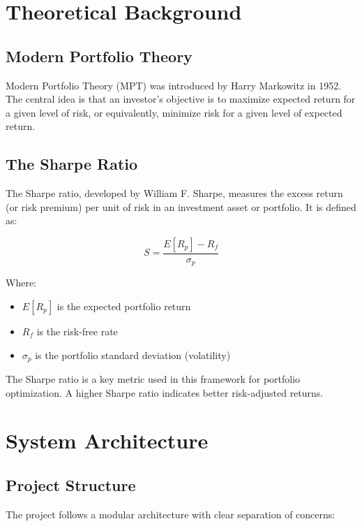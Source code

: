 \documentclass[11pt,a4paper]{article}
\begin{document}
\section{Theoretical Background}

\subsection{Modern Portfolio Theory}

Modern Portfolio Theory (MPT) was introduced by Harry Markowitz in 1952. The central idea is that an investor's objective is to maximize expected return for a given level of risk, or equivalently, minimize risk for a given level of expected return.

\subsection{The Sharpe Ratio}

The Sharpe ratio, developed by William F. Sharpe, measures the excess return (or risk premium) per unit of risk in an investment asset or portfolio. It is defined as:

\begin{equation}
    S = \frac{E[R_p] - R_f}{\sigma_p}
\end{equation}

Where:
\begin{itemize}
    \item $E[R_p]$ is the expected portfolio return
    \item $R_f$ is the risk-free rate
    \item $\sigma_p$ is the portfolio standard deviation (volatility)
\end{itemize}

The Sharpe ratio is a key metric used in this framework for portfolio optimization. A higher Sharpe ratio indicates better risk-adjusted returns.

\section{System Architecture}

\subsection{Project Structure}

The project follows a modular architecture with clear separation of concerns:
\end{document}
